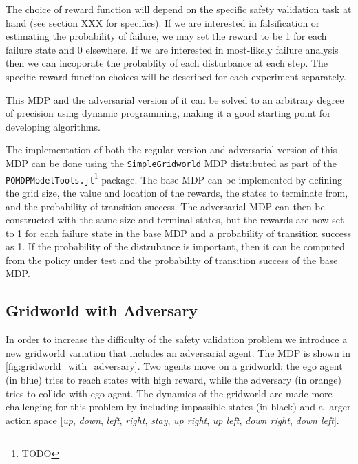 The choice of reward function will depend on the specific safety validation task at hand (see section XXX for specifics). If we are interested in falsification or estimating the probability of failure, we may set the reward to be \num{1} for each failure state and \num{0} elsewhere. If we are interested in most-likely failure analysis then we can incoporate the probablity of each disturbance at each step. The specific reward function choices will be described for each experiment separately. 

This MDP and the adversarial version of it can be solved to an arbitrary degree of precision using dynamic programming, making it a good starting point for developing algorithms. 

The implementation of both the regular version and adversarial version of this MDP can be done using the \texttt{SimpleGridworld} MDP distributed as part of the \texttt{POMDPModelTools.jl}\footnote{TODO} package. The base MDP can be implemented by defining the grid size, the value and location of the rewards, the states to terminate from, and the probability of transition success. The adversarial MDP can then be constructed with the same size and terminal states, but the rewards are now set to \num{1} for each failure state in the base MDP and a probability of transition success as \num{1}. If the probability of the distrubance is important, then it can be computed from the policy under test and the probability of transition success of the base MDP.

\subsection{Gridworld with Adversary}

In order to increase the difficulty of the safety validation problem we introduce a new gridworld variation that includes an adversarial agent. The MDP is shown in \cref{fig:gridworld_with_adversary}. Two agents move on a gridworld: the ego agent (in blue) tries to reach states with high reward, while the adversary (in orange) tries to collide with ego agent. The dynamics of the gridworld are made more challenging for this problem by including impassible states (in black) and a larger action space [\emph{up}, \emph{down}, \emph{left}, \emph{right}, \emph{stay}, \emph{up right}, \emph{up left}, \emph{down right}, \emph{down left}].

